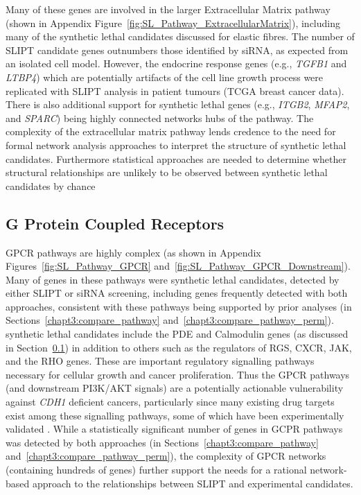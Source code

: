 Many of these genes are involved in the larger Extracellular Matrix pathway (shown in Appendix Figure~\ref{fig:SL_Pathway_ExtracellularMatrix}), including many of the \gls{synthetic lethal} candidates discussed for elastic fibres. The number of \gls{SLIPT} candidate genes outnumbers those identified by \gls{siRNA}, as expected from an isolated cell model. However, the endocrine response genes (e.g., \textit{TGFB1} and \textit{LTBP4}) which are potentially artifacts of the cell line growth process were replicated with \gls{SLIPT} analysis in patient tumours (TCGA breast cancer data). There is also additional support for \gls{synthetic lethal} genes (e.g., \textit{ITGB2}, \textit{MFAP2}, and \textit{SPARC}) being highly connected networks hubs of the pathway. The complexity of the extracellular matrix pathway lends credence to the need for formal network analysis approaches to interpret the  structure of \gls{synthetic lethal} candidates. Furthermore statistical approaches are needed to determine whether structural relationships are unlikely to be observed between \gls{synthetic lethal} candidates by chance 

\FloatBarrier

\subsection{G Protein Coupled Receptors}  \label{chapt4:SL_Genes_GPCR}

\acrfull{GPCR} pathways are highly complex (as shown in Appendix Figures~\ref{fig:SL_Pathway_GPCR} and~\ref{fig:SL_Pathway_GPCR_Downstream}). Many of genes in these pathways were \gls{synthetic lethal} candidates, detected by either \gls{SLIPT} or \gls{siRNA} screening, including genes frequently detected with both approaches, consistent with these pathways being supported by prior analyses (in Sections~\ref{chapt3:compare_pathway} and~\ref{chapt3:compare_pathway_perm}). \Gls{synthetic lethal} candidates include the \gls{PDE} and Calmodulin genes (as discussed in Section~\ref{chapt4:SL_Genes_GPCR}) in addition to others such as the regulators of \gls{RGS}, \gls{CXCR}, \acrfull{JAK}, and the \gls{RHO} genes. These are important regulatory signalling pathways necessary for cellular growth and cancer proliferation. Thus the \gls{GPCR} pathways (and downstream PI3K/AKT signals) are a potentially actionable vulnerability against \textit{CDH1} deficient cancers, particularly since many existing drug targets exist among these signalling pathways, some of which have been experimentally validated \citep{Telford2015}. While a statistically significant number of genes in GCPR pathways was detected by both approaches (in Sections~\ref{chapt3:compare_pathway} and~\ref{chapt3:compare_pathway_perm}), the complexity of \gls{GPCR} networks (containing hundreds of genes) further support the needs for a rational network-based approach to the relationships between \gls{SLIPT} and experimental candidates.


